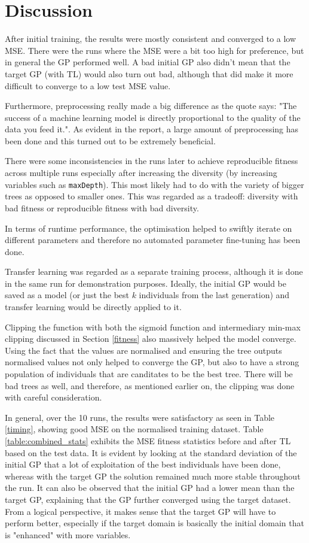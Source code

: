 \documentclass{article}
\begin{document}
\section{Discussion}
After initial training, the results were mostly consistent and converged to a low MSE. There were the runs where the MSE were a bit too high for preference, but in general the GP performed well. A bad initial GP also didn't mean that the target GP (with TL) would also turn out bad, although that did make it more difficult to converge to a low test MSE value.

Furthermore, preprocessing really made a big difference as the quote says: "The success of a machine learning model is directly proportional to the quality of the data you feed it.". As evident in the report, a large amount of preprocessing has been done and this turned out to be extremely beneficial.

There were some inconsistencies in the runs later to achieve reproducible fitness across multiple runs especially after increasing the diversity (by increasing variables such as \texttt{maxDepth}). This most likely had to do with the variety of bigger trees as opposed to smaller ones. This was regarded as a tradeoff: diversity with bad fitness or reproducible fitness with bad diversity.

In terms of runtime performance, the optimisation helped to swiftly iterate on different parameters and therefore no automated parameter fine-tuning has been done.

Transfer learning was regarded as a separate training process, although it is done in the same run for demonstration purposes. Ideally, the initial GP would be saved as a model (or just the best \(k\) individuals from the last generation) and transfer learning would be directly applied to it.

Clipping the function with both the sigmoid function and intermediary min-max clipping discussed in Section \ref{fitness} also massively helped the model converge. Using the fact that the values are normalised and ensuring the tree outputs normalised values not only helped to converge the GP, but also to have a strong population of individuals that are canditates to be the best tree. There will be bad trees as well, and therefore, as mentioned earlier on, the clipping was done with careful consideration.

In general, over the 10 runs, the results were satisfactory as seen in Table \ref{timing}, showing good MSE on the normalised training dataset. Table \ref{table:combined_stats} exhibits the MSE fitness statistics before and after TL based on the test data. It is evident by looking at the standard deviation of the initial GP that a lot of exploitation of the best individuals have been done, whereas with the target GP the solution remained much more stable throughout the run. It can also be observed that the initial GP had a lower mean than the target GP, explaining that the GP further converged using the target dataset. From a logical perspective, it makes sense that the target GP will have to perform better, especially if the target domain is basically the initial domain that is "enhanced" with more variables.
\end{document}
